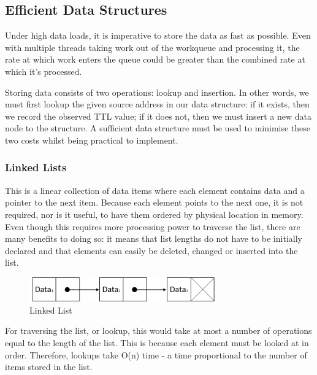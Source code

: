 \documentclass[twocolumn,10pt]{asme2ej}
\begin{document}
\subsection{Efficient Data Structures} \label{data_structures}

Under high data loads, it is imperative to store the data as fast as possible. Even with multiple threads taking work out of the workqueue and processing it, the rate at which work enters the queue could be greater than the combined rate at which it's processed.

Storing data consists of two operations: lookup and insertion. In other words, we must first lookup the given source address in our data structure: if it exists, then we record the observed TTL value; if it does not, then we must insert a new data node to the structure. A sufficient data structure must be used to minimise these two costs whilst being practical to implement.

\subsubsection{Linked Lists}
This is a linear collection of data items where each element contains data and a pointer to the next item. Because each element points to the next one, it is not required, nor is it useful, to have them ordered by physical location in memory. Even though this requires more processing power to traverse the list, there are many benefits to doing so: it means that list lengths do not have to be initially declared and that elements can easily be deleted, changed or inserted into the list.

\begin{figure}[h]
	\begin{center}
		\includegraphics[width=8.00cm, height=1.04cm]{figures/linked_list}
	\end{center}
	\caption{Linked List}
	\label{figure_linked_list} 
\end{figure}

For traversing the list, or lookup, this would take at most a number of operations equal to the length of the list. This is because each element must be looked at in order. Therefore, lookups take O(n) time - a time proportional to the number of items stored in the list.
\end{document}
